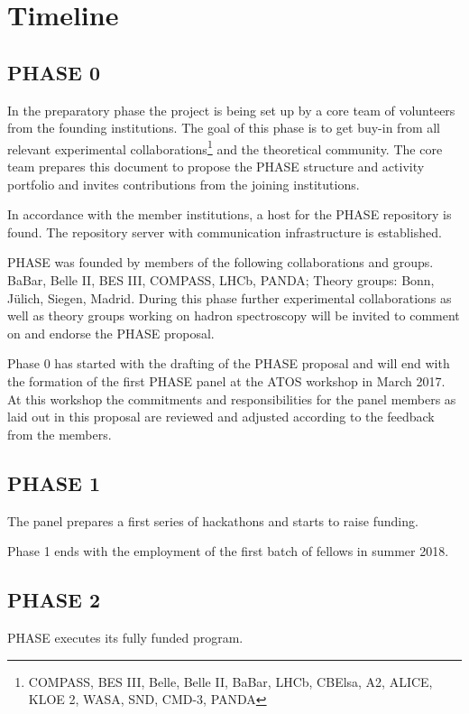 \section{Timeline}

\subsection{PHASE 0}
In the preparatory phase the project is being set up by a core team of volunteers from the founding institutions. The goal of this phase is to get buy-in from all relevant
experimental collaborations\footnote{COMPASS, BES III, Belle, Belle II, BaBar, LHCb, CBElsa, A2, ALICE, KLOE 2, WASA, SND, CMD-3, PANDA} and the theoretical community.  The core team prepares this document to propose the PHASE structure and activity portfolio and invites contributions from the joining institutions.

In accordance with the member institutions, a host for the PHASE repository is found. The repository server with communication infrastructure is established.

PHASE was founded by members of the following collaborations and groups. BaBar, Belle II, BES III, COMPASS, LHCb, PANDA; Theory groups: Bonn, J\"ulich, Siegen, Madrid.
During this phase further experimental collaborations as well as theory groups working on hadron spectroscopy will be invited to comment on and endorse the PHASE proposal. 

Phase 0 has started with the drafting of the PHASE proposal and will end with the formation of the first PHASE panel at the ATOS workshop in March 2017. At this workshop the commitments and responsibilities for the panel members as laid out in this proposal are reviewed and adjusted according to the feedback from the members.

\subsection{PHASE 1}
The panel prepares a first series of hackathons and starts to raise funding.

Phase 1 ends with the employment of the first batch of fellows in summer 2018.
\subsection{PHASE 2}
PHASE executes its fully funded program.
